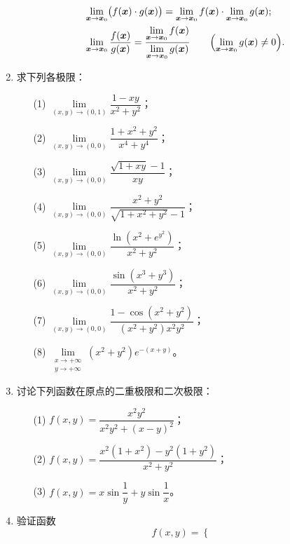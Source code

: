 \documentclass[11pt]{ctexart}
\theoremstyle{plain}
\theoremstyle{definition}
\theoremstyle{remark}
\begin{document}
\begin{enumerate}
\begin{align*}
          &\lim_{\boldsymbol{x}\to\boldsymbol{x}_0}\bigl(f(\boldsymbol{x})\cdot g(\boldsymbol{x})\bigr)
           =\lim_{\boldsymbol{x}\to\boldsymbol{x}_0}f(\boldsymbol{x})
           \cdot\lim_{\boldsymbol{x}\to\boldsymbol{x}_0}g(\boldsymbol{x});\\
          &\lim_{\boldsymbol{x}\to\boldsymbol{x}_0}\frac{f(\boldsymbol{x})}{g(\boldsymbol{x})}
           =\frac{\lim\limits_{\boldsymbol{x}\to\boldsymbol{x}_0}f(\boldsymbol{x})}
                 {\lim\limits_{\boldsymbol{x}\to\boldsymbol{x}_0}g(\boldsymbol{x})}
           \qquad\Bigl(\lim_{\boldsymbol{x}\to\boldsymbol{x}_0}g(\boldsymbol{x})\neq 0\Bigr).
        \end{align*}
  \item 求下列各极限：
        \begin{enumerate}
          \item[(1)] \(\lim\limits_{(x,y)\to(0,1)}\dfrac{1-xy}{x^2+y^2}\)；
          \item[(2)] \(\lim\limits_{(x,y)\to(0,0)}\dfrac{1+x^2+y^2}{x^4+y^4}\)；
          \item[(3)] \(\lim\limits_{(x,y)\to(0,0)}\dfrac{\sqrt{1+xy}-1}{xy}\)；
          \item[(4)] \(\lim\limits_{(x,y)\to(0,0)}\dfrac{x^2+y^2}{\sqrt{1+x^2+y^2}-1}\)；
          \item[(5)] \(\lim\limits_{(x,y)\to(0,0)}\dfrac{\ln(x^2+e^{y^2})}{x^2+y^2}\)；
          \item[(6)] \(\lim\limits_{(x,y)\to(0,0)}\dfrac{\sin(x^3+y^3)}{x^2+y^2}\)；
          \item[(7)] \(\lim\limits_{(x,y)\to(0,0)}\dfrac{1-\cos(x^2+y^2)}{(x^2+y^2)x^2y^2}\)；
          \item[(8)] \(\lim\limits_{\substack{x\to+\infty\\ y\to+\infty}}(x^2+y^2)e^{-(x+y)}\)。
        \end{enumerate}
  \item 讨论下列函数在原点的二重极限和二次极限：
        \begin{enumerate}
          \item[(1)] \(f(x,y)=\dfrac{x^2y^2}{x^2y^2+(x-y)^2}\)；
          \item[(2)] \(f(x,y)=\dfrac{x^2(1+x^2)-y^2(1+y^2)}{x^2+y^2}\)；
          \item[(3)] \(f(x,y)=x\sin\dfrac{1}{y}+y\sin\dfrac{1}{x}\)。
        \end{enumerate}
  \item 验证函数
        \[
          f(x,y)=
          \begin{cases}

\end{cases}\]
\end{enumerate}
\end{document}
